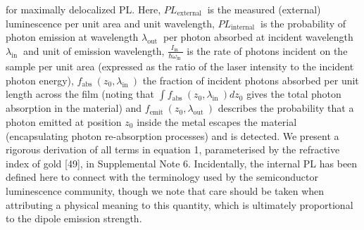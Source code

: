 \documentclass[10pt]{article}
\begin{document}
for maximally delocalized PL. Here, $P L_{\text {external }}$ is the measured (external) luminescence per unit area and unit wavelength, $P L_{\text {internal }}$ is the probability of photon emission at wavelength $\lambda_{\text {out }}$ per photon absorbed at incident wavelength $\lambda_{\text {in }}$ and unit of emission wavelength, $\frac{I_{\text {in }}}{\hbar \omega_{\text {in }}}$ is the rate of photons incident on the sample per unit area (expressed as the ratio of the laser intensity to the incident photon energy), $f_{\text {abs }}\left(z_{0}, \lambda_{\text {in }}\right)$ the fraction of incident photons absorbed per unit length across the film (noting that $\int f_{\text {abs }}\left(z_{0}, \lambda_{\text {in }}\right) d z_{0}$ gives the total photon absorption in the material) and $f_{\text {emit }}\left(z_{0}, \lambda_{\text {out }}\right)$ describes the probability that a photon emitted at position $z_{0}$ inside the metal escapes the material (encapsulating photon re-absorption processes) and is detected. We present a rigorous derivation of all terms in equation 1, parameterised by the refractive index of gold [49], in Supplemental Note 6. Incidentally, the internal PL has been defined here to connect with the terminology used by the semiconductor luminescence community, though we note that care should be taken when attributing a physical meaning to this quantity, which is ultimately proportional to the dipole emission strength.
\end{document}
